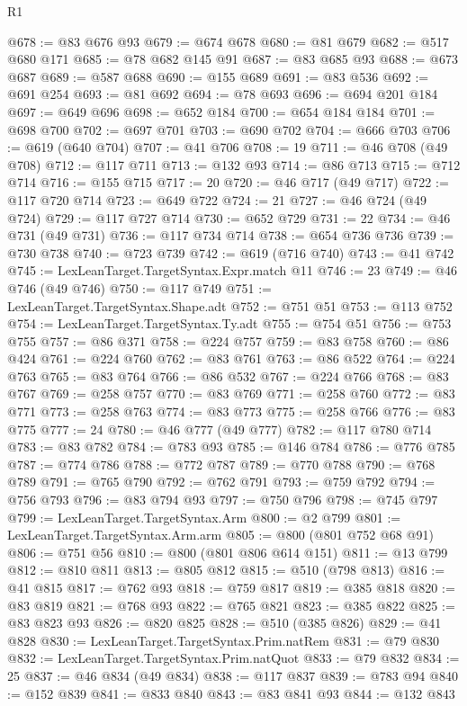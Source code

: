 \begin{lexlean}{R1}
\begin{coremodule}
@678 := @83 @676 @93
@679 := @674 @678
@680 := @81 @679
@682 := @517 @680 @171
@685 := @78 @682 @145 @91
@687 := @83 @685 @93
@688 := @673 @687
@689 := @587 @688
@690 := @155 @689
@691 := @83 @536
@692 := @691 @254
@693 := @81 @692
@694 := @78 @693
@696 := @694 @201 @184
@697 := @649 @696
@698 := @652 @184
@700 := @654 @184 @184
@701 := @698 @700
@702 := @697 @701
@703 := @690 @702
@704 := @666 @703
@706 := @619 (@640 @704)
@707 := @41 @706
@708 := 19
@711 := @46 @708 (@49 @708)
@712 := @117 @711
@713 := @132 @93
@714 := @86 @713
@715 := @712 @714
@716 := @155 @715
@717 := 20
@720 := @46 @717 (@49 @717)
@722 := @117 @720 @714
@723 := @649 @722
@724 := 21
@727 := @46 @724 (@49 @724)
@729 := @117 @727 @714
@730 := @652 @729
@731 := 22
@734 := @46 @731 (@49 @731)
@736 := @117 @734 @714
@738 := @654 @736 @736
@739 := @730 @738
@740 := @723 @739
@742 := @619 (@716 @740)
@743 := @41 @742
@745 := LexLeanTarget.TargetSyntax.Expr.match @11
@746 := 23
@749 := @46 @746 (@49 @746)
@750 := @117 @749
@751 := LexLeanTarget.TargetSyntax.Shape.adt
@752 := @751 @51
@753 := @113 @752
@754 := LexLeanTarget.TargetSyntax.Ty.adt
@755 := @754 @51
@756 := @753 @755
@757 := @86 @371
@758 := @224 @757
@759 := @83 @758
@760 := @86 @424
@761 := @224 @760
@762 := @83 @761
@763 := @86 @522
@764 := @224 @763
@765 := @83 @764
@766 := @86 @532
@767 := @224 @766
@768 := @83 @767
@769 := @258 @757
@770 := @83 @769
@771 := @258 @760
@772 := @83 @771
@773 := @258 @763
@774 := @83 @773
@775 := @258 @766
@776 := @83 @775
@777 := 24
@780 := @46 @777 (@49 @777)
@782 := @117 @780 @714
@783 := @83 @782
@784 := @783 @93
@785 := @146 @784
@786 := @776 @785
@787 := @774 @786
@788 := @772 @787
@789 := @770 @788
@790 := @768 @789
@791 := @765 @790
@792 := @762 @791
@793 := @759 @792
@794 := @756 @793
@796 := @83 @794 @93
@797 := @750 @796
@798 := @745 @797
@799 := LexLeanTarget.TargetSyntax.Arm
@800 := @2 @799
@801 := LexLeanTarget.TargetSyntax.Arm.arm
@805 := @800 (@801 @752 @68 @91)
@806 := @751 @56
@810 := @800 (@801 @806 @614 @151)
@811 := @13 @799
@812 := @810 @811
@813 := @805 @812
@815 := @510 (@798 @813)
@816 := @41 @815
@817 := @762 @93
@818 := @759 @817
@819 := @385 @818
@820 := @83 @819
@821 := @768 @93
@822 := @765 @821
@823 := @385 @822
@825 := @83 @823 @93
@826 := @820 @825
@828 := @510 (@385 @826)
@829 := @41 @828
@830 := LexLeanTarget.TargetSyntax.Prim.natRem
@831 := @79 @830
@832 := LexLeanTarget.TargetSyntax.Prim.natQuot
@833 := @79 @832
@834 := 25
@837 := @46 @834 (@49 @834)
@838 := @117 @837
@839 := @783 @94
@840 := @152 @839
@841 := @833 @840
@843 := @83 @841 @93
@844 := @132 @843

\end{coremodule}
\end{lexlean}
